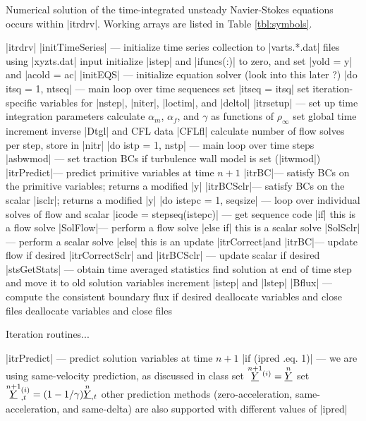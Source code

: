 \documentclass[11pt]{article}
\begin{document}
Numerical solution of the time-integrated unsteady Navier-Stokes equations occurs within |itrdrv|. Working arrays are listed in Table \ref{tbl:symbols}.
\begin{outline}[deep]
\1 |itrdrv|
	\2 |initTimeSeries| --- initialize time series collection to |varts.*.dat| files using |xyzts.dat| input
	\2 initialize |istep| and |ifuncs(:)| to zero, and set |yold = y| and |acold = ac|
	\2 |initEQS| --- initialize equation solver (look into this later \ra ?)
	\2 |do itsq = 1, ntseq| --- main loop over time sequences
		\3 set |itseq = itsq|
		\3 set iteration-specific variables for |nstep|, |niter|, |loctim|, and |deltol|
		\3 |itrsetup| --- set up time integration parameters
			\4 calculate $\alpha_m$, $\alpha_f$, and $\gamma$ as functions of $\rho_\infty$
			\4 set global time increment inverse |Dtgl| and CFL data |CFLfl|
		\3 calculate number of flow solves per step, store in |nitr|
		\3 |do istp = 1, nstp| --- main loop over time steps
			\4 |asbwmod| --- set traction BCs if turbulence wall model is set (|itwmod|)
			\4 |itrPredict|\ra --- predict primitive variables at time $n+1$
			\4 |itrBC|\ra --- satisfy BCs on the primitive variables; returns a modified |y|
			\4 |itrBCSclr|\ra --- satisfy BCs on the scalar |isclr|; returns a modified |y|
			\4 |do istepc = 1, seqsize| --- loop over individual solves of flow and scalar
				\5 |icode = stepseq(istepc)| --- get sequence code
				\5 |if| this is a flow solve
					\6 |SolFlow|\ra --- perform a flow solve
				\5 |else if| this is a scalar solve
					\6 |SolSclr| --- perform a scalar solve
				\5 |else| this is an update
					\6 |itrCorrect|\ra and |itrBC|\ra --- update flow if desired
					\6 |itrCorrectSclr| and |itrBCSclr| --- update scalar if desired
			\4 |stsGetStats| --- obtain time averaged statistics
			\4 find solution at end of time step and move it to old solution variables
			\4 increment |istep| and |lstep|
			\4 |Bflux| --- compute the consistent boundary flux if desired
		\3 deallocate variables and close files
	\2 deallocate variables and close files
\end{outline}

Iteration routines...

\begin{outline}[deep]
\1 |itrPredict| --- predict solution variables at time $n+1$
	\2 |if (ipred .eq. 1)| --- we are using same-velocity prediction, as discussed in class
		\3 set $\oset{n+1}{\ul{Y}}^{(i)} = \oset{n}{\ul{Y}}$
		\3 set $\oset{n+1}{\ul{Y}}^{(i)}_{,t} = (1-1/\gamma) \oset{n}{\ul{Y}}_{,t}$
	\2 other prediction methods (zero-acceleration, same-acceleration, and same-delta) are also supported with different values of |ipred|
\end{outline}
\end{document}
